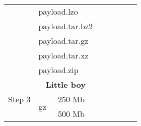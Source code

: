 \documentclass{article}           %
\begin{document}
\begin{table}[]
\begin{tabular}{llllllll}
\multicolumn{1}{|l|}{}                               & \multicolumn{2}{l|}{payload.lzo}                                            & \multicolumn{1}{l|}{}       & \multicolumn{1}{l|}{}       & \multicolumn{1}{l|}{}           & \multicolumn{1}{l|}{}      & \multicolumn{1}{l|}{}        \\ \cline{2-8} 
\multicolumn{1}{|l|}{}                               & \multicolumn{2}{l|}{payload.tar.bz2}                                        & \multicolumn{1}{l|}{}       & \multicolumn{1}{l|}{}       & \multicolumn{1}{l|}{}           & \multicolumn{1}{l|}{}      & \multicolumn{1}{l|}{}        \\ \cline{2-8} 
\multicolumn{1}{|l|}{}                               & \multicolumn{2}{l|}{payload.tar.gz}                                         & \multicolumn{1}{l|}{}       & \multicolumn{1}{l|}{}       & \multicolumn{1}{l|}{}           & \multicolumn{1}{l|}{}      & \multicolumn{1}{l|}{}        \\ \cline{2-8} 
\multicolumn{1}{|l|}{}                               & \multicolumn{2}{l|}{payload.tar.xz}                                         & \multicolumn{1}{l|}{}       & \multicolumn{1}{l|}{}       & \multicolumn{1}{l|}{}           & \multicolumn{1}{l|}{}      & \multicolumn{1}{l|}{}        \\ \cline{2-8} 
\multicolumn{1}{|l|}{}                               & \multicolumn{2}{l|}{payload.zip}                                            & \multicolumn{1}{l|}{}       & \multicolumn{1}{l|}{}       & \multicolumn{1}{l|}{}           & \multicolumn{1}{l|}{}      & \multicolumn{1}{l|}{}        \\ \hline
\multicolumn{1}{|l|}{\multirow{40}{*}{Step 3}}       & \multicolumn{2}{c|}{\textbf{Little boy}}                                    & \multicolumn{5}{l|}{}                                                                                                                                   \\ \cline{2-8} 
\multicolumn{1}{|l|}{}                               & \multicolumn{1}{l|}{\multirow{4}{*}{gz}}      & \multicolumn{1}{l|}{250 Mb} & \multicolumn{1}{l|}{}       & \multicolumn{1}{l|}{}       & \multicolumn{1}{l|}{}           & \multicolumn{1}{l|}{}      & \multicolumn{1}{l|}{}        \\ \cline{3-8} 
\multicolumn{1}{|l|}{}                               & \multicolumn{1}{l|}{}                         & \multicolumn{1}{l|}{500 Mb} & \multicolumn{1}{l|}{}       & \multicolumn{1}{l|}{}       & \multicolumn{1}{l|}{}           & \multicolumn{1}{l|}{}      & \multicolumn{1}{l|}{}        \\ \cline{3-8} 

\end{tabular}
\end{table}
\end{document}
